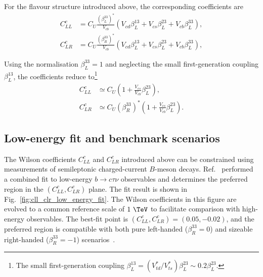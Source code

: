 For the flavour structure introduced above, the corresponding coefficients
are
\begin{align}
    C_{LL}^{c}
    &=
    C_{U}
    \frac{
        \left(\beta_{L}^{33}\right)^{*}
    }{
        V_{cb}
    }
    \left(
        V_{cd}\beta_{L}^{13}
        +
        V_{cs}\beta_{L}^{23}
        +
        V_{cb}\beta_{L}^{33}
    \right),
    \label{eq:cll_c}
    \\
    C_{LR}^{c}
    &=
    C_{U}
    \frac{
        \left(\beta_{R}^{33}\right)^{*}
    }{
        V_{cb}
    }
    \left(
        V_{cd}\beta_{L}^{13}
        +
        V_{cs}\beta_{L}^{23}
        +
        V_{cb}\beta_{L}^{33}
    \right),
    \label{eq:clr_c}
\end{align}

Using the normalisation $\beta_{L}^{33}=1$ and neglecting the small
first-generation coupling $\beta_{L}^{13}$, the coefficients reduce to\footnote{The small first-generation coupling $\beta_L^{13}=(V_{td}^{*}/V_{ts}^{*})\beta_L^{23}\sim0.2\beta_L^{23}$.}
\begin{align}
    C_{LL}^{c}
    &\simeq
    C_{U}
    \left(
        1+
        \frac{V_{cs}}{V_{cb}}\beta_{L}^{23}
    \right),
    \label{eq:cll_c_approx}
    \\
    C_{LR}^{c}
    &\simeq
    C_{U}
    \left(\beta_{R}^{33}\right)^{*}
    \left(
        1+
        \frac{V_{cs}}{V_{cb}}\beta_{L}^{23}
    \right).
    \label{eq:clr_c_approx}
\end{align}

\subsection{Low-energy fit and benchmark scenarios}
\label{subsec:u1_low_energy_fit}

The Wilson coefficients $C_{LL}^{c}$ and $C_{LR}^{c}$ introduced above can be constrained using measurements of semileptonic charged-current $B$-meson decays. Ref.~\cite{Aebischer2022} performed a combined fit to low-energy $b\rightarrow c\tau\nu$ observables and determines the preferred region in the $(C_{LL}^{c},C_{LR}^{c})$ plane. The fit result is shown in Fig.~\ref{fig:cll_clr_low_energy_fit}. The Wilson coefficients in this figure are evolved to a common reference scale of $1~\TeV$ to facilitate comparison with high-energy observables. The best-fit point is $(C_{LL}^{c}, C_{LR}^{c})=(0.05,-0.02)$, and the preferred region is compatible with both pure left-handed ($\beta_{R}^{33}=0$) and sizeable right-handed ($\beta_{R}^{33}=-1$) scenarios~\cite{Aebischer2022}.

